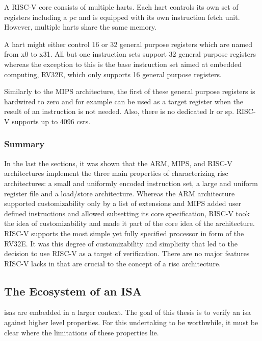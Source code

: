 A RISC-V core consists of multiple \glspl{hart}.
Each \gls{hart} controls its own set of registers including a \gls{pc} and is equipped with its own instruction fetch unit.
However, multiple \glspl{hart} share the same memory.

A \gls{hart} might either control 16 or 32 general purpose registers which are named from x0 to x31.
All but one instruction sets support 32 general purpose registers whereas the exception to this is the base instruction set aimed at embedded computing, RV32E, which only supports 16 general purpose registers.

Similarly to the MIPS architecture, the first of these general purpose registers is hardwired to zero and for example can be used as a target register when the result of an instruction is not needed.
Also, there is no dedicated \gls{lr} or \gls{sp}.
RISC-V supports up to 4096 \glspl{csr}.

\subsubsection{Summary}

In the last the sections, it was shown that the ARM, MIPS, and RISC-V architectures implement the three main properties of \cite{Hennessy12} characterizing \gls{risc} architectures: a small and uniformly encoded instruction set, a large and uniform register file and a load/store architecture.
Whereas the ARM architecture supported customizability only by a list of extensions and MIPS added user defined instructions and allowed subsetting its core specification, RISC-V took the idea of customizability and made it part of the core idea of the architecture.
RISC-V supports the most simple yet fully specified processor in form of the RV32E.
It was this degree of customizability and simplicity that led to the decision to use RISC-V as a target of verification.
There are no major features RISC-V lacks in that are crucial to the concept of a \gls{risc} architecture.

\subsection{The Ecosystem of an ISA}
\label{sec:ecosystem}

\glspl{isa} are embedded in a larger context.
The goal of this thesis is to verify an \gls{isa} against higher level properties.
For this undertaking to be worthwhile, it must be clear where the limitations of these properties lie.

